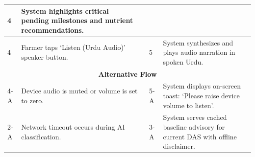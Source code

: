 \documentclass{FastFyp}
\begin{document}
\begin{table}[!ht]
\begin{tabular}{|lllll|}
  \multicolumn{1}{p{0.8cm}|}{4} &
  \multicolumn{1}{p{5.6cm}|}{System highlights critical pending milestones and nutrient recommendations.} \\ \hline
\multicolumn{1}{|p{0.8cm}|}{4} &
  \multicolumn{2}{p{6.0cm}|}{Farmer taps `Listen (Urdu Audio)' speaker button.} &
  \multicolumn{1}{p{0.8cm}|}{5} &
  \multicolumn{1}{p{5.6cm}|}{System synthesizes and plays audio narration in spoken Urdu.} \\ \hline
\multicolumn{5}{|c|}{\textbf{Alternative Flow}} \\ \hline
\multicolumn{1}{|p{0.8cm}|}{4-A} &
  \multicolumn{2}{p{6.0cm}|}{Device audio is muted or volume is set to zero.} &
  \multicolumn{1}{p{0.8cm}|}{5-A} &
  \multicolumn{1}{p{5.6cm}|}{System displays on-screen toast: `Please raise device volume to listen'.} \\ \hline
\multicolumn{1}{|p{0.8cm}|}{2-A} &
  \multicolumn{2}{p{6.0cm}|}{Network timeout occurs during AI classification.} &
  \multicolumn{1}{p{0.8cm}|}{3-A} &
  \multicolumn{1}{p{5.6cm}|}{System serves cached baseline advisory for current DAS with offline disclaimer.} \\ \hline
\end{tabular}
\end{table}
\end{document}
